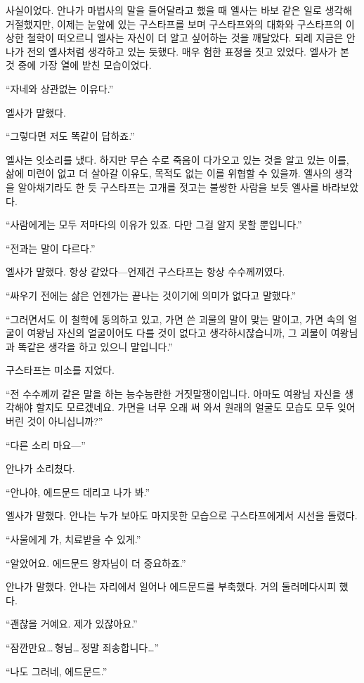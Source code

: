 사실이었다. 안나가 마법사의 말을 들어달라고 했을 때 엘사는 바보 같은 일로 생각해 거절했지만, 이제는 눈앞에 있는 구스타프를 보며 구스타프와의 대화와 구스타프의 이상한 철학이 떠오르니 엘사는 자신이 더 알고 싶어하는 것을 깨달았다. 되레 지금은 안나가 전의 엘사처럼 생각하고 있는 듯했다. 매우 험한 표정을 짓고 있었다. 엘사가 본 것 중에 가장 열에 받친 모습이었다.

``자네와 상관없는 이유다.''

엘사가 말했다.

``그렇다면 저도 똑같이 답하죠.''

엘사는 잇소리를 냈다. 하지만 무슨 수로 죽음이 다가오고 있는 것을 알고 있는 이를, 삶에 미련이 없고 더 살아갈 이유도, 목적도 없는 이를 위협할 수 있을까. 엘사의 생각을 알아채기라도 한 듯 구스타프는 고개를 젓고는 불쌍한 사람을 보듯 엘사를 바라보았다.

``사람에게는 모두 저마다의 이유가 있죠. 다만 그걸 알지 못할 뿐입니다.''

``전과는 말이 다르다.''

엘사가 말했다. 항상 같았다—언제건 구스타프는 항상 수수께끼였다.

``싸우기 전에는 삶은 언젠가는 끝나는 것이기에 의미가 없다고 말했다.''

``그러면서도 이 철학에 동의하고 있고, 가면 쓴 괴물의 말이 맞는 말이고, 가면 속의 얼굴이 여왕님 자신의 얼굴이어도 다를 것이 없다고 생각하시잖습니까, 그 괴물이 여왕님과 똑같은 생각을 하고 있으니 말입니다.''

구스타프는 미소를 지었다.

``전 수수께끼 같은 말을 하는 능수능란한 거짓말쟁이입니다. 아마도 여왕님 자신을 생각해야 할지도 모르겠네요. 가면을 너무 오래 써 와서 원래의 얼굴도 모습도 모두 잊어버린 것이 아니십니까?''

``다른 소리 마요—''

안나가 소리쳤다.

``안나야, 에드문드 데리고 나가 봐.''

엘사가 말했다. 안나는 누가 보아도 마지못한 모습으로 구스타프에게서 시선을 돌렸다.

``사울에게 가, 치료받을 수 있게.''

``알았어요. 에드문드 왕자님이 더 중요하죠.''

안나가 말했다. 안나는 자리에서 일어나 에드문드를 부축했다. 거의 둘러메다시피 했다.

``괜찮을 거예요. 제가 있잖아요.''

``잠깐만요\ldots\,형님\ldots\,정말 죄송합니다\ldots''

``나도 그러네, 에드문드.''

